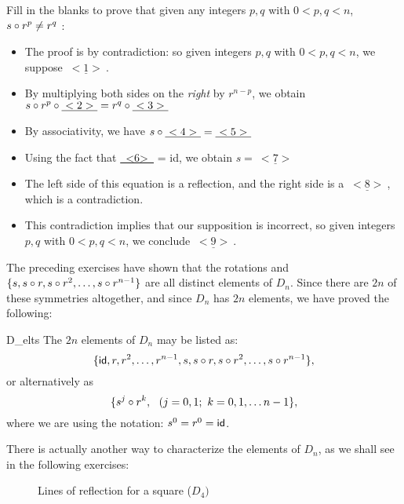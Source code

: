 \begin{exercise}{34}
Fill in the blanks to prove that given any integers $p,q$ with $0< p,q < n$, $s \circ r^p \neq r^q$ :
\begin{itemize}
\item
The proof is by contradiction: so given integers $p,q$ with $0< p,q < n$, we suppose $\underline{~<1>~}$.
\item
By multiplying both sides on the \emph{right} by $r^{n-p}$, we obtain $s \circ r^p \circ \underline{~<2>~} = r^q \circ \underline{~<3>~}$
\item
By associativity, we have $s \circ  \underline{~<4>~} =  \underline{~<5>~}$
\item
Using the fact that \underline{~<6>~} = {\var id}, we obtain $s = \underline{~<7>~}$
\item
The left side of this equation is a reflection, and the right side is a $\underline{~<8>~}$, which is a contradiction.
\item
This contradiction implies that our supposition is incorrect, so  given integers $p,q$ with $0< p,q < n$, we conclude $\underline{~<9>~}$.
\end{itemize}
\end{exercise}

The preceding exercises have shown that the rotations and $\{s, s \circ r, s \circ r^2,
\ldots, s \circ r^{n-1}\}$ are all distinct elements of $D_n$. Since there are $2n$ of these symmetries altogether, and since $D_n$ has  $2n$ elements, we have proved the following:

\begin{prop}{D_elts}
The $2n$ elements of $D_n$ may be listed as: 
\[\{ {\sf{i}d}, r, r^2, \ldots, r^{n-1},  s, s \circ r, s\circ r^2, \ldots, s \circ r^{n-1}\},\]
or alternatively  as
\[\{  s^j \circ r^k, ~~(j=0,1;~ k = 0,1,\ldots n-1 \},\]
where we are using the notation:  $s^0 = r^0 = {\sf{i}d}$.
\end{prop}

There is actually another way to characterize the elements of $D_n$, as we shall see in the following exercises:

 
\begin{figure}[hbt]
\begin{center}

\end{center}
\caption{Lines of reflection for a square ($D_4)$}
\label{D4}
\end{figure}


